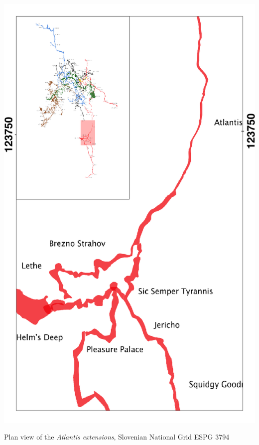 \begin{marginfigure}
\checkoddpage \ifoddpage \forcerectofloat \else \forceversofloat \fi
\centering
 \includegraphics[width=\linewidth]{images/2014/tanguy-2014/atlantis_inset}
 \caption{Plan view of the \emph{Atlantis extensions}, Slovenian National Grid ESPG 3794}
 \label{Atlantis inset}
\end{marginfigure}


